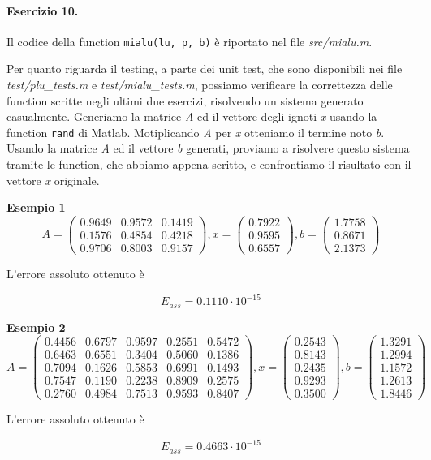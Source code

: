 \paragraph{Esercizio 10.} Il codice della function \verb|mialu(lu, p, b)| è riportato nel file \emph{src/mialu.m}.

Per quanto riguarda il testing, a parte dei unit test, che sono disponibili nei file \emph{test/plu\_tests.m} e \emph{test/mialu\_tests.m}, possiamo verificare la correttezza delle function scritte negli ultimi due esercizi, risolvendo un sistema generato casualmente. Generiamo la matrice \emph{A} ed il vettore degli ignoti \emph{x} usando la function \verb|rand| di Matlab. Motiplicando \emph{A} per \emph{x} otteniamo il termine noto \emph{b}. Usando la matrice \emph{A} ed il vettore \emph{b} generati, proviamo a risolvere questo sistema tramite le function, che abbiamo appena scritto, e confrontiamo il risultato con il vettore \emph{x} originale.

\textbf{Esempio 1}
\[
A = \begin{pmatrix}
0.9649 & 0.9572 & 0.1419\\
0.1576 & 0.4854 & 0.4218\\
0.9706 & 0.8003 & 0.9157
\end{pmatrix}, x = \begin{pmatrix}
0.7922\\
0.9595\\
0.6557
\end{pmatrix}, b = \begin{pmatrix}
1.7758\\
0.8671\\
2.1373
\end{pmatrix}
\]

L'errore assoluto ottenuto è

\[
E_{ass} = 0.1110 \cdot 10^{-15}
\]

\textbf{Esempio 2}
\[
A = \begin{pmatrix}
0.4456 & 0.6797 & 0.9597 & 0.2551 & 0.5472\\
0.6463 & 0.6551 & 0.3404 & 0.5060 & 0.1386\\
0.7094 & 0.1626 & 0.5853 & 0.6991 & 0.1493\\
0.7547 & 0.1190 & 0.2238 & 0.8909 & 0.2575\\
0.2760 & 0.4984 & 0.7513 & 0.9593 & 0.8407
\end{pmatrix}, x = \begin{pmatrix}
0.2543\\
0.8143\\
0.2435\\
0.9293\\
0.3500
\end{pmatrix}, b = \begin{pmatrix}
1.3291\\
1.2994\\
1.1572\\
1.2613\\
1.8446
\end{pmatrix}
\]

L'errore assoluto ottenuto è

\[
E_{ass} = 0.4663 \cdot 10^{-15}
\]
